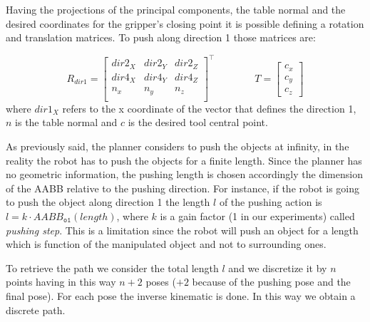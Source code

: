 Having the projections of the principal components, the table normal and the desired coordinates for the gripper's closing point it is possible defining a rotation and translation matrices. To push along direction 1 those matrices are:

\begin{equation}
R_{dir1} =
\begin{bmatrix}
dir2_X & dir2_Y & dir2_Z \\
dir4_X & dir4_Y & dir4_Z \\
n_x & n_y & n_z \\
\end{bmatrix}^{\top}
\qquad \qquad
T=
\begin{bmatrix}
c_x \\ c_y \\ c_z
\end{bmatrix}
\label{eq:transform}
\end{equation}
where $dir1_X$ refers to the x coordinate of the vector that defines the direction 1, $n$ is the table normal and $c$ is the desired tool central point. 

As previously said, the planner considers to push the objects at infinity, in the reality the robot has to push the objects for a finite length. Since the planner has no geometric information, the pushing length is chosen accordingly the dimension of the AABB relative to the pushing direction. For instance, if the robot is going to push the object  along direction 1 the length $l$ of the pushing action is $l=k \cdot AABB_{\mathtt{o1}}(length)$, where $k$ is a gain factor (1 in our experiments) called \textit{pushing step}. This is a limitation since the robot will push an object for a length which is function of the manipulated object and not to surrounding ones. 

To retrieve the path we consider the total length $l$ and we discretize it by $n$ points having in this way $n+2$ poses ($+2$ because of the pushing pose and the final pose). For each pose the inverse kinematic is done. In this way we obtain a discrete path. 


